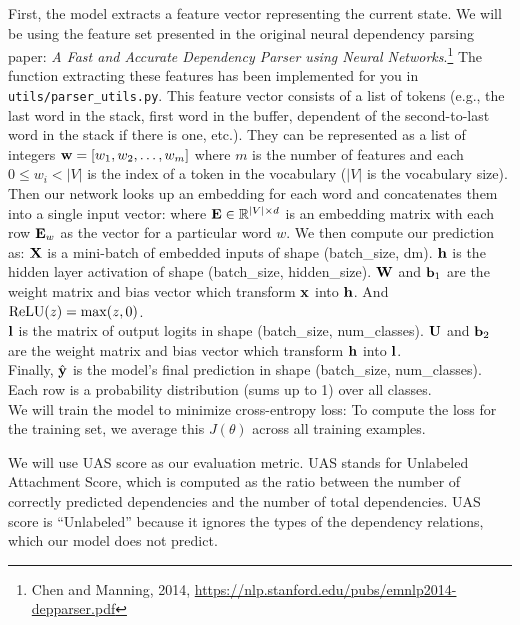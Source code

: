 \begin{parts}
    First, the model extracts a feature vector representing the current state. We will be using the feature set presented in the original neural dependency parsing paper: {\it A Fast and Accurate Dependency Parser using Neural Networks}.\footnote{Chen and Manning, 2014, \url{https://nlp.stanford.edu/pubs/emnlp2014-depparser.pdf}} The function extracting these features has been implemented for you in \texttt{utils/parser\_utils.py}. This feature vector consists of a list of tokens (e.g., the last word in the stack, first word in the buffer, dependent of the second-to-last word in the stack if there is one, etc.). They can be represented as a list of integers $\mathbf{w} = [w_1, w_2, \dots, w_m]$ where $m$ is the number of features and each $0 \leq w_i < |V|$ is the index of a token in the vocabulary ($|V|$ is the vocabulary size). Then our network looks up an embedding for each word and concatenates them into a single input vector:
    where $\mathbf{E} \in \mathbb{R}^{|V| \times d}$ is an embedding matrix with each row $\mathbf{E}_w$ as the vector for a particular word $w$. We then compute our prediction as:
    $\mathbf{X}$ is a mini-batch of embedded inputs of shape (batch\_size, dm). $\mathbf{h}$ is the hidden layer activation of shape (batch\_size, hidden\_size). $\mathbf{W}$ and $\mathbf{b}_1$ are the weight matrix and bias vector which transform $\mathbf{x}$ into $\mathbf{h}$. And $\operatorname{ReLU}(z) = \max(z, 0)$.\\
    $\mathbf{l}$ is the matrix of output logits in shape (batch\_size, num\_classes). $\mathbf{U}$ and $\mathbf{b}_2$ are the weight matrix and bias vector which transform $\mathbf{h}$ into $\mathbf{l}$.\\
    Finally, $\hat{\mathbf{y}}$ \space is the model's final prediction in shape (batch\_size, num\_classes). Each row is a probability distribution (sums up to 1) over all classes.\\  
    We will train the model to minimize cross-entropy loss:
    \alns{
    	J(\theta) &= CE(\by, \byt) = -\sum \limits_{i = 1}^{3} y_i \log \hat{y}_i
    }
    To compute the loss for the training set, we average this $J(\theta)$ across all training examples.
    
    We will use UAS score as our evaluation metric. UAS stands for Unlabeled Attachment Score, which is computed as the ratio between the number of correctly predicted dependencies and the number of total dependencies. UAS score is ``Unlabeled'' because it ignores the types of the dependency relations, which our model does not predict.\newline
    

\end{parts}
